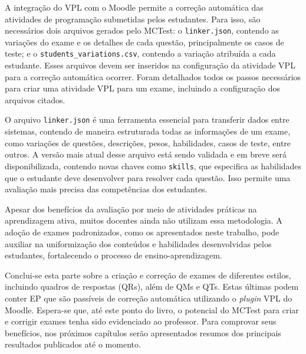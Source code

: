 A integração do VPL com o Moodle permite a correção automática das atividades de programação submetidas pelos estudantes. Para isso, são necessários dois arquivos gerados pelo MCTest: o \verb|linker.json|, contendo as variações do exame e os detalhes de cada questão, principalmente os casos de teste; e o \verb|students_variations.csv|, contendo a variação atribuída a cada estudante. Esses arquivos devem ser inseridos na configuração da atividade VPL para a correção automática ocorrer. Foram detalhados todos os passos necessários para criar uma atividade VPL para um exame, incluindo a configuração dos arquivos citados.

O arquivo \verb|linker.json| é uma ferramenta essencial para transferir dados entre sistemas, contendo de maneira estruturada todas as informações de um exame, como variações de questões, descrições, pesos, habilidades, casos de teste, entre outros. A versão mais atual desse arquivo está sendo validada e em breve será disponibilizada, contendo novas chaves como \verb|skills|, que especifica as habilidades que o estudante deve desenvolver para resolver cada questão. Isso permite uma avaliação mais precisa das competências dos estudantes.

Apesar dos benefícios da avaliação por meio de atividades práticas na aprendizagem ativa, muitos docentes ainda não utilizam essa metodologia. A adoção de exames padronizados, como os apresentados neste trabalho, pode auxiliar na uniformização dos conteúdos e habilidades desenvolvidas pelos estudantes, fortalecendo o processo de ensino-aprendizagem. 

Conclui-se esta parte sobre a criação e correção de exames de diferentes estilos, incluindo quadros de respostas (QRs), além de QMs e QTs. Estas últimas podem conter EP que são passíveis de correção automática utilizando o \textit{plugin} VPL do Moodle. Espera-se que, até este ponto do livro, o potencial do MCTest para criar e corrigir exames tenha sido evidenciado ao professor. Para comprovar seus benefícios, nos próximos capítulos serão apresentados resumos dos principais resultados publicados até o momento.

